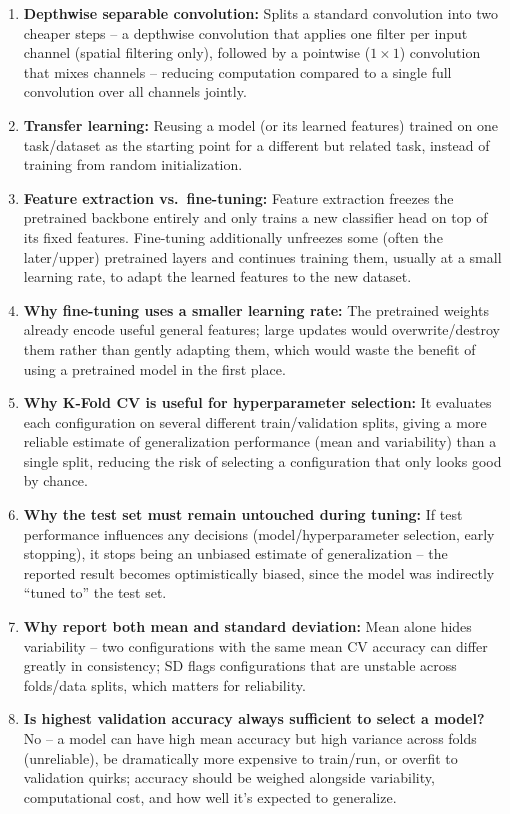 \documentclass[10pt]{article}
\begin{document}
\begin{enumerate}
\item \textbf{Depthwise separable convolution:} Splits a standard
convolution into two cheaper steps -- a depthwise convolution that
applies one filter per input channel (spatial filtering only), followed
by a pointwise ($1\times1$) convolution that mixes channels -- reducing
computation compared to a single full convolution over all channels
jointly.

\item \textbf{Transfer learning:} Reusing a model (or its learned
features) trained on one task/dataset as the starting point for a
different but related task, instead of training from random
initialization.

\item \textbf{Feature extraction vs.\ fine-tuning:} Feature extraction
freezes the pretrained backbone entirely and only trains a new classifier
head on top of its fixed features. Fine-tuning additionally unfreezes
some (often the later/upper) pretrained layers and continues training
them, usually at a small learning rate, to adapt the learned features to
the new dataset.

\item \textbf{Why fine-tuning uses a smaller learning rate:} The
pretrained weights already encode useful general features; large updates
would overwrite/destroy them rather than gently adapting them, which
would waste the benefit of using a pretrained model in the first place.

\item \textbf{Why K-Fold CV is useful for hyperparameter selection:} It
evaluates each configuration on several different train/validation
splits, giving a more reliable estimate of generalization performance
(mean and variability) than a single split, reducing the risk of
selecting a configuration that only looks good by chance.

\item \textbf{Why the test set must remain untouched during tuning:} If
test performance influences any decisions (model/hyperparameter
selection, early stopping), it stops being an unbiased estimate of
generalization -- the reported result becomes optimistically biased,
since the model was indirectly ``tuned to'' the test set.

\item \textbf{Why report both mean and standard deviation:} Mean alone
hides variability -- two configurations with the same mean CV accuracy
can differ greatly in consistency; SD flags configurations that are
unstable across folds/data splits, which matters for reliability.

\item \textbf{Is highest validation accuracy always sufficient to select
a model?} No -- a model can have high mean accuracy but high variance
across folds (unreliable), be dramatically more expensive to train/run,
or overfit to validation quirks; accuracy should be weighed alongside
variability, computational cost, and how well it's expected to
generalize.

\end{enumerate}
\end{document}
